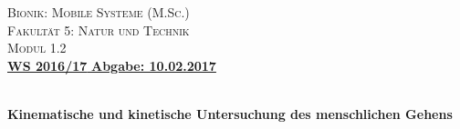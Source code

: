 \begin{titlepage}
\begin{minipage}[c]{9cm}
\vspace{0pt}
\textsc{\large Bionik: Mobile Systeme (M.Sc.)}\\
\textsc{Fakultät 5: Natur und Technik}\\
\textsc{\small Modul 1.2}\\
[0.5cm]
\underline{\large \textbf{WS 2016/17}\hspace{9cm} \textbf{Abgabe: 10.02.2017}}\\
\end{minipage}
\begin{minipage}[c]{6cm}
\vspace{0pt}
\vspace{1cm}
\end{minipage}

\begin{center}
\vspace{5cm}


\\
[1.5cm]

\huge \bfseries Kinematische und kinetische Untersuchung des menschlichen Gehens\\
[0.4cm]

\vfill

\end{center}
\normalsize
{}\\
{}\\
{}\\
\end{titlepage}